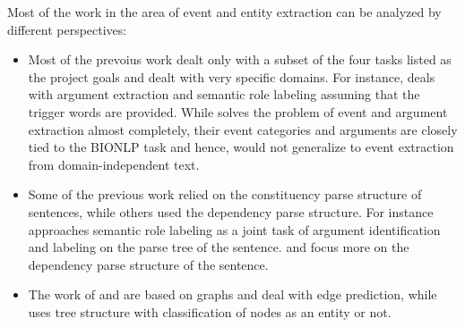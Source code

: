 
Most of the work in the area of event and entity extraction can be analyzed by different perspectives:

\begin{itemize}

\item {} Most of the prevoius work dealt only with a subset of the four tasks listed as the project goals and dealt with very specific domains. For instance, \citeauthor{toutanova} deals with argument extraction and semantic role labeling assuming that the trigger words are provided. While \citeauthor{bjorne} solves the problem of event and argument extraction almost completely, their event categories and arguments are closely tied to the BIONLP task and hence, would not generalize to event extraction from domain-independent text.

\item {} Some of the previous work relied on the constituency parse structure of sentences, while others used the dependency parse structure. For instance \citeauthor{toutanova} approaches semantic role labeling as a joint task of argument identification and labeling on the parse tree of the sentence. \citeauthor{bjorne} and \citeauthor{mcclosky} focus more on the dependency parse structure of the sentence.

\item {} The work of \citeauthor{bjorne} and \citeauthor{mcclosky} are based on graphs and deal with edge prediction, while \citeauthor{toutanova} uses tree structure with classification of nodes as an entity or not.

\end{itemize}
